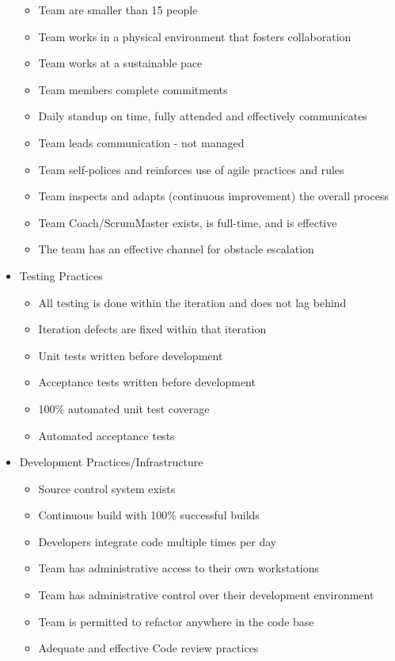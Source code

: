 \begin{appendices}
\begin{itemize}
\begin{itemize}
			\item Team are smaller than 15 people
			\item Team works in a physical environment that fosters collaboration
			\item Team works at a sustainable pace
			\item Team members complete commitments
			\item Daily standup on time, fully attended and effectively communicates
			\item Team leads communication - not managed
			\item Team self-polices and reinforces use of agile practices and rules
			\item Team inspects and adapts (continuous improvement) the overall process
			\item Team Coach/ScrumMaster exists, is full-time, and is effective
			\item The team has an effective channel for obstacle escalation
		\end{itemize}
	\item Testing Practices
		\begin{itemize}
			\item All testing is done within the iteration and does not lag behind
			\item Iteration defects are fixed within that iteration
			\item Unit tests written before development
			\item Acceptance tests written before development
			\item 100\% automated unit test coverage
			\item Automated acceptance tests
		\end{itemize}
	\item Development Practices/Infrastructure
		\begin{itemize}
			\item Source control system exists
			\item Continuous build with 100\% successful builds
			\item Developers integrate code multiple times per day
			\item Team has administrative access to their own workstations
			\item Team has administrative control over their development environment
			\item Team is permitted to refactor anywhere in the code base
			\item Adequate and effective Code review practices

\end{itemize}
\end{itemize}
\end{appendices}
